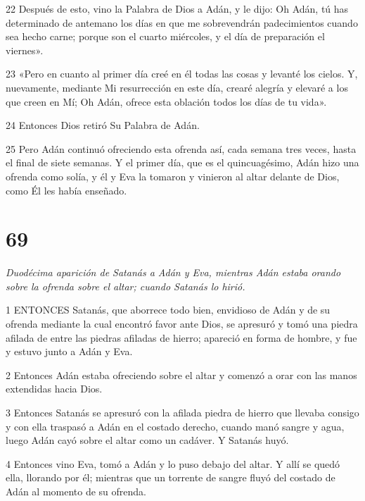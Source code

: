 \par 22 Después de esto, vino la Palabra de Dios a Adán, y le dijo: Oh Adán, tú has determinado de antemano los días en que me sobrevendrán padecimientos cuando sea hecho carne; porque son el cuarto miércoles, y el día de preparación el viernes».

\par 23 «Pero en cuanto al primer día creé en él todas las cosas y levanté los cielos. Y, nuevamente, mediante Mi resurrección en este día, crearé alegría y elevaré a los que creen en Mí; Oh Adán, ofrece esta oblación todos los días de tu vida».

\par 24 Entonces Dios retiró Su Palabra de Adán.

\par 25 Pero Adán continuó ofreciendo esta ofrenda así, cada semana tres veces, hasta el final de siete semanas. Y el primer día, que es el quincuagésimo, Adán hizo una ofrenda como solía, y él y Eva la tomaron y vinieron al altar delante de Dios, como Él les había enseñado.



\chapter{69}

\par \textit{Duodécima aparición de Satanás a Adán y Eva, mientras Adán estaba orando sobre la ofrenda sobre el altar; cuando Satanás lo hirió.}

\par 1 ENTONCES Satanás, que aborrece todo bien, envidioso de Adán y de su ofrenda mediante la cual encontró favor ante Dios, se apresuró y tomó una piedra afilada de entre las piedras afiladas de hierro; apareció en forma de hombre, y fue y estuvo junto a Adán y Eva.

\par 2 Entonces Adán estaba ofreciendo sobre el altar y comenzó a orar con las manos extendidas hacia Dios.

\par 3 Entonces Satanás se apresuró con la afilada piedra de hierro que llevaba consigo y con ella traspasó a Adán en el costado derecho, cuando manó sangre y agua, luego Adán cayó sobre el altar como un cadáver. Y Satanás huyó.

\par 4 Entonces vino Eva, tomó a Adán y lo puso debajo del altar. Y allí se quedó ella, llorando por él; mientras que un torrente de sangre fluyó del costado de Adán al momento de su ofrenda.

